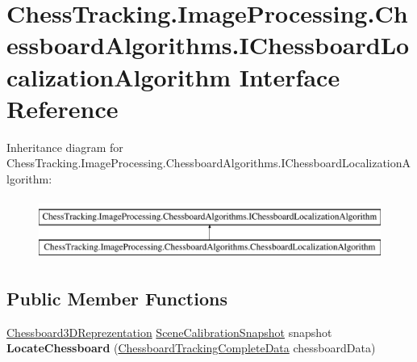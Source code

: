 \hypertarget{interface_chess_tracking_1_1_image_processing_1_1_chessboard_algorithms_1_1_i_chessboard_localization_algorithm}{}\section{Chess\+Tracking.\+Image\+Processing.\+Chessboard\+Algorithms.\+I\+Chessboard\+Localization\+Algorithm Interface Reference}
\label{interface_chess_tracking_1_1_image_processing_1_1_chessboard_algorithms_1_1_i_chessboard_localization_algorithm}
Inheritance diagram for Chess\+Tracking.\+Image\+Processing.\+Chessboard\+Algorithms.\+I\+Chessboard\+Localization\+Algorithm\+:\begin{figure}[H]
\begin{center}
\leavevmode
\includegraphics[height=2.000000cm]{interface_chess_tracking_1_1_image_processing_1_1_chessboard_algorithms_1_1_i_chessboard_localization_algorithm}
\end{center}
\end{figure}
\subsection*{Public Member Functions}
\begin{DoxyCompactItemize}
\item 
\mbox{\label{interface_chess_tracking_1_1_image_processing_1_1_chessboard_algorithms_1_1_i_chessboard_localization_algorithm_a53fca1495b5d93e859616eb23f2873a5}} 
\mbox{\hyperlink{class_chess_tracking_1_1_image_processing_1_1_chessboard_algorithms_1_1_chessboard3_d_reprezentation}{Chessboard3\+D\+Reprezentation}} \mbox{\hyperlink{class_chess_tracking_1_1_image_processing_1_1_pipeline_data_1_1_scene_calibration_snapshot}{Scene\+Calibration\+Snapshot}} snapshot {\bfseries Locate\+Chessboard} (\mbox{\hyperlink{class_chess_tracking_1_1_image_processing_1_1_pipeline_data_1_1_chessboard_tracking_complete_data}{Chessboard\+Tracking\+Complete\+Data}} chessboard\+Data)
\end{DoxyCompactItemize}
